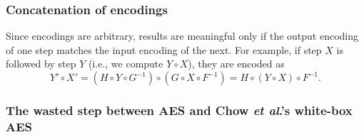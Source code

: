\documentclass{beamer}
\begin{document}
\frame
{
\frametitle{Concatenation of encodings}
Since encodings are arbitrary, results are meaningful only if the output encoding of one step matches the input encoding of the next. For example, if step $X$ is followed by step $Y$ (i.e., we compute $Y \circ X$), they are encoded as
\[Y' \circ X' = (H \circ Y \circ G^{-1}) \circ (G \circ X \circ F^{-1}) = H \circ (Y \circ X) \circ F^{-1}.\]

}

\frame
{
\frametitle{The wasted step between AES and Chow \textit{et al}.'s white-box AES}






}
\end{document}
